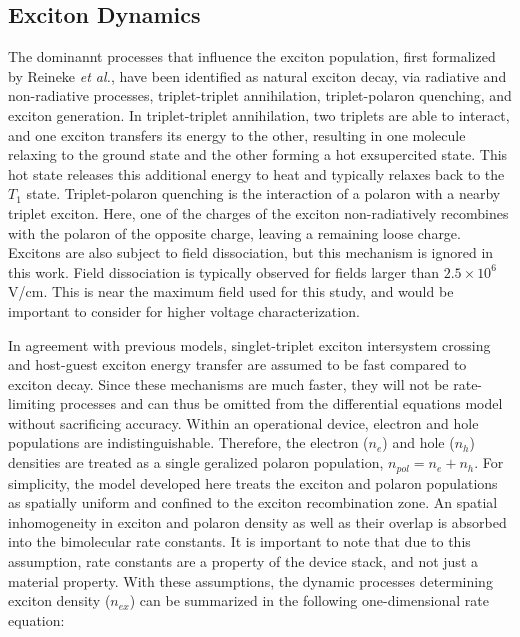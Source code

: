 \documentclass[../thesis.tex]{subfiles}
\begin{document}
\subsection{Exciton Dynamics}
The dominannt processes that influence the exciton population, first formalized by Reineke \textit{et al.}\supercite{Reineke2007}, have been identified as natural exciton decay, via radiative and non-radiative processes, triplet-triplet annihilation, triplet-polaron quenching, and exciton generation.\supercite{Erickson2014,Song2010}
In triplet-triplet annihilation, two triplets are able to interact, and one exciton transfers its energy to the other, resulting in one molecule relaxing to the ground state and the other forming a hot exsupercited state.
This hot state releases this additional energy to heat and typically relaxes back to the $T_1$ state.  
Triplet-polaron quenching is the interaction of a polaron with a nearby triplet exciton.
Here, one of the charges of the exciton non-radiatively recombines with the polaron of the opposite charge, leaving a remaining loose charge.
Excitons are also subject to field dissociation, but this mechanism is ignored in this work.
Field dissociation is typically observed for fields larger than $2.5 \times 10^6$ V/cm.  
This is near the maximum field used for this study, and would be important to consider for higher voltage characterization.

In agreement with previous models, singlet-triplet exciton intersystem crossing and host-guest exciton energy transfer are assumed to be fast compared to exciton decay.\supercite{Reineke2007,Baldo2000a,Turro1991a}
Since these mechanisms are much faster, they will not be rate-limiting processes and can thus be omitted from the differential equations model without sacrificing accuracy.
Within an operational device, electron and hole populations are indistinguishable.
Therefore, the electron ($n_e$) and hole ($n_h$) densities are treated as a single geralized polaron population, $n_{pol}=n_e+n_h$.
For simplicity, the model developed here treats the exciton and polaron populations as spatially uniform and confined to the exciton recombination zone.  An spatial inhomogeneity in exciton and polaron density as well as their overlap is absorbed into the bimolecular rate constants.
It is important to note that due to this assumption, rate constants are a property of the device stack, and not just a material property.
With these assumptions, the dynamic processes determining exciton density ($n_{ex}$) can be summarized in the following one-dimensional rate equation:
\end{document}
